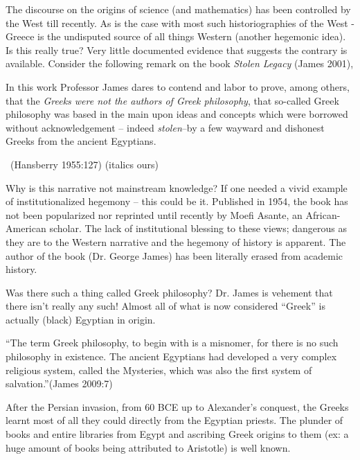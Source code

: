 The discourse on the origins of science (and mathematics) has been controlled by the West till recently. As is the case with most such historiographies of the West - Greece is the undisputed source of all things Western (another hegemonic idea). Is this really true? Very little documented evidence that suggests the contrary is available. Consider the following remark on the book \textit{Stolen Legacy} (James 2001),

\begin{myquote}
In this work Professor James dares to contend and labor to prove, among others, that the \textit{Greeks were not the authors of Greek philosophy}, that so-called Greek philosophy was based in the main upon ideas and concepts which were borrowed without acknowledgement -- indeed \textit{stolen}--by a few wayward and dishonest Greeks from the ancient Egyptians. 

~\hfill (Hansberry 1955:127) (italics ours)
\end{myquote}

Why is this narrative not mainstream knowledge? If one needed a vivid example of institutionalized hegemony – this could be it. Published in 1954, the book has not been popularized nor reprinted until recently by Moefi Asante, an African-American scholar. The lack of institutional blessing to these views; dangerous as they are to the Western narrative and the hegemony of history is apparent. The author of the book (Dr. George James) has been literally erased from academic history.

Was there such a thing called Greek philosophy? Dr. James is vehement that there isn’t really any such! Almost all of what is now considered “Greek” is actually (black) Egyptian in origin.

\begin{myquote}
“The term Greek philosophy, to begin with is a misnomer, for there is no such philosophy in existence. The ancient Egyptians had developed a very complex religious system, called the Mysteries, which was also the first system of salvation.”\hfill (James 2009:7)
\end{myquote}

After the Persian invasion, from 60 BCE up to Alexander’s conquest, the Greeks learnt most of all they could directly from the Egyptian priests. The plunder of books and entire libraries from Egypt and ascribing Greek origins to them (ex: a huge amount of books being attributed to Aristotle) is well known.

